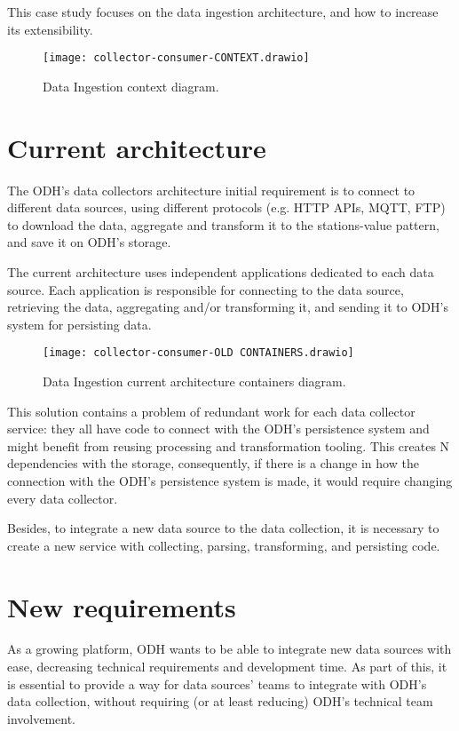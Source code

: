 This case study focuses on the data ingestion architecture, and how to increase its extensibility.

\begin{figure}
    \centering
    \texttt{[image: collector-consumer-CONTEXT.drawio]}
    \caption{Data Ingestion context diagram.\label{fig:subfigures9}}
\end{figure}

\section{Current architecture}
\label{sec:current}

The ODH's data collectors architecture initial requirement is to connect to different data sources, using different protocols (e.g. HTTP APIs, MQTT, FTP) to download the data, aggregate and transform it to the stations-value pattern, and save it on ODH’s storage.

The current architecture uses independent applications dedicated to each data source. Each application is responsible for connecting to the data source, retrieving the data, aggregating and/or transforming it, and sending it to ODH's system for persisting data.

\begin{figure}
    \centering
    \texttt{[image: collector-consumer-OLD CONTAINERS.drawio]}
    \caption{Data Ingestion current architecture containers diagram.\label{fig:subfigures10}}
\end{figure}

This solution contains a problem of redundant work for each data collector service: they all have code to connect with the ODH's persistence system and might benefit from reusing processing and transformation tooling. This creates N dependencies with the storage, consequently, if there is a change in how the connection with the ODH's persistence system is made, it would require changing every data collector.

Besides, to integrate a new data source to the data collection, it is necessary to create a new service with collecting, parsing, transforming, and persisting code.

\section{New requirements}
\label{sec:requirements}

As a growing platform, ODH wants to be able to integrate new data sources with ease, decreasing technical requirements and development time. As part of this, it is essential to provide a way for data sources' teams to integrate with ODH's data collection, without requiring (or at least reducing) ODH's technical team involvement.

